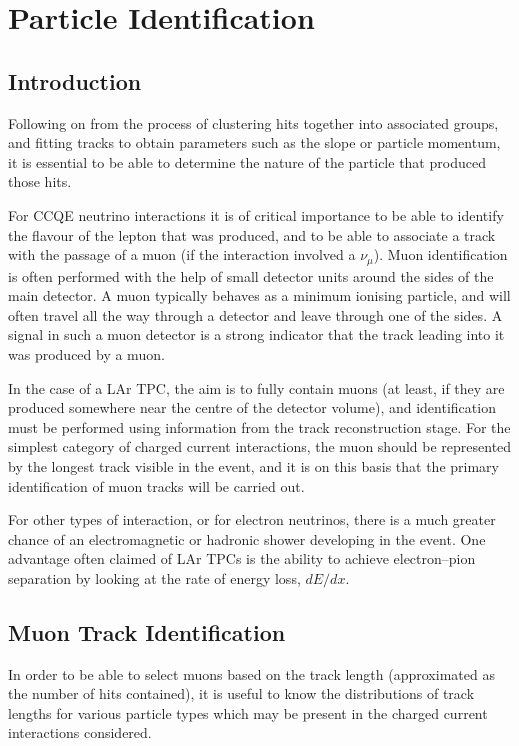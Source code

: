 \chapter{Particle Identification}

\section{Introduction}
Following on from the process of clustering hits together into associated groups, and fitting tracks to obtain parameters such as the slope or particle momentum, it is essential to be able to determine the nature of the particle that produced those hits.

For \ac{CCQE} neutrino interactions it is of critical importance to be able to identify the flavour of the lepton that was produced, and to be able to associate a track with the passage of a muon (if the interaction involved a $\nu_\mu$). Muon identification is often performed with the help of small detector units around the sides of the main detector. A muon typically behaves as a minimum ionising particle, and will often travel all the way through a detector and leave through one of the sides. A signal in such a muon detector is a strong indicator that the track leading into it was produced by a muon.

In the case of a \ac{LAr TPC}, the aim is to fully contain muons (at least, if they are produced somewhere near the centre of the detector volume), and identification must be performed using information from the track reconstruction stage. For the simplest category of charged current interactions, the muon should be represented by the longest track visible in the event, and it is on this basis that the primary identification of muon tracks will be carried out.

For other types of interaction, or for electron neutrinos, there is a much greater chance of an electromagnetic or hadronic shower developing in the event. One advantage often claimed of LAr TPCs is the ability to achieve electron--pion separation by looking at the rate of energy loss, $dE/dx$.

\section{Muon Track Identification}
In order to be able to select muons based on the track length (approximated as the number of hits contained), it is useful to know the distributions of track lengths for various particle types which may be present in the charged current interactions considered. 

